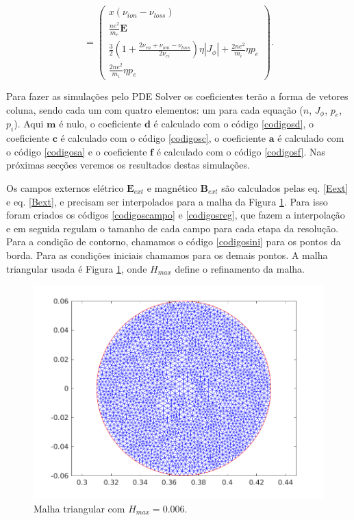 \documentclass[12pt,oneside,a4paper]{abntex2}
\begin{document}
\begin{displaymath}
= \left(\begin{array}{c}
x ( \nu_{ion} - \nu_{loss} )\\
\frac{ne^2}{m_e} \bm{E} \\
\frac{3}{2}(1+\frac{2 \nu_{en} + \nu_{ion} - \nu_{loss}}{2\nu_{ei}})\eta |J_\phi|  +\frac{2ne^2}{m_i} \eta p_e\\
\frac{2ne^2}{m_i}\eta p_e
\end{array}\right).
\end{displaymath}

Para fazer as simulações pelo PDE Solver os coeficientes terão a forma de vetores coluna, sendo cada um com quatro elementos: um para cada equação ($n$, $J_\phi$, $p_e$, $p_i$). Aqui $\bm{m}$ é nulo, o coeficiente $\bm{d}$ é calculado com o código \ref{codigosd}, o coeficiente $\bm{c}$ é calculado com o código \ref{codigosc}, o coeficiente $\bm{a}$ é calculado com o código \ref{codigosa} e o coeficiente $\bm{f}$ é calculado com o código \ref{codigosf}. Nas próximas  secções veremos os resultados destas simulações.

Os campos externos elétrico $\bm{E}_{ext}$ e magnético $\bm{B}_{ext}$ são calculados pelas eq. \ref{Eext} e eq. \ref{Bext}, e precisam ser interpolados para a malha da Figura \ref{triangmesh}. Para isso foram criados os  códigos \ref{codigoscampo} e \ref{codigosreg}, que fazem a interpolação e em seguida regulam o tamanho de cada campo para cada etapa da resolução.
Para a condição de contorno, chamamos o código \ref{codigosini} para os pontos da borda. Para as condições iniciais chamamos para os demais pontos. A malha triangular usada é Figura \ref{triangmesh}, onde $H_{max}$ define o refinamento da malha.
\begin{figure}[H]
\centering
\includegraphics[scale=1]{../SImulacao_breakdown/PDE/malha.png}  
\caption{Malha triangular com $H_{max}=0.006$.}
\label{triangmesh}
\end{figure}
\end{document}
